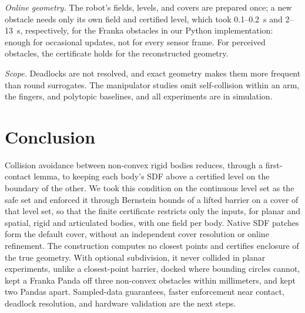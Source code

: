 \documentclass[journal]{IEEEtran}
\theoremstyle{definition}
\begin{document}
\emph{Online geometry.} The robot's fields, levels, and covers are prepared once; a new obstacle needs
only its own field and certified level, which took 0.1--0.2~s and 2--13~s, respectively, for the
Franka obstacles in our Python implementation: enough for occasional updates, not for every sensor
frame. For perceived obstacles, the certificate holds for the reconstructed geometry.

\emph{Scope.} Deadlocks are not resolved, and exact geometry makes them more frequent than round
surrogates. The manipulator studies omit self-collision within an arm, the fingers, and polytopic
baselines, and all experiments are in simulation.

\section{Conclusion}\label{sec:concl}
Collision avoidance between non-convex rigid bodies reduces, through a first-contact lemma, to
keeping each body's SDF above a certified level on the boundary of the other. We took this condition
on the continuous level set as the safe set and enforced it through Bernstein bounds of a lifted
barrier on a cover of that level set, so that the finite certificate restricts only the inputs, for
planar and spatial, rigid and articulated bodies, with one field per body. Native SDF patches form
the default cover, without an independent cover resolution or online refinement. The construction computes
no closest points and certifies enclosure of the true geometry. With optional subdivision, it never collided in planar
experiments, unlike a closest-point barrier, docked where bounding circles cannot, kept a Franka
Panda off three non-convex obstacles within millimeters, and kept two Pandas apart. Sampled-data
guarantees, faster enforcement near contact, deadlock resolution, and hardware validation are the
next steps.



\end{document}
